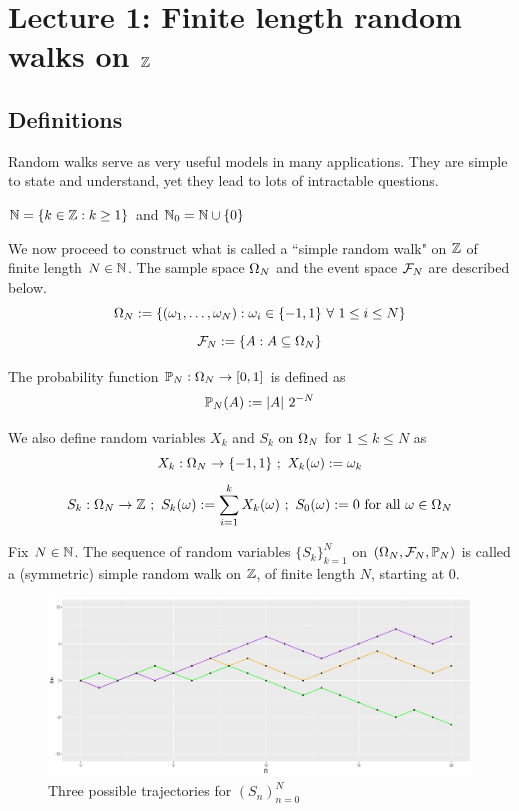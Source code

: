 \documentclass[main]{subfiles}
\begin{document}
\chapter*{Lecture 1: Finite length random walks on $\Z$} %
\setcounter{chapter}{1} %
\setcounter{section}{0}


\vspace{-0.75cm}
\section{Definitions}

Random walks serve as very useful models in many applications. They are simple to state and understand, yet they lead to lots of intractable questions.\\

\begin{notation}
    $ \N=\{k\in\Z:k\ge 1\} $ and $ \N_{0}=\N \cup \{0\} $\\
\end{notation}
We now proceed to construct what is called a ``simple random walk" on $ \Z $ of finite length $ N\in\N $.
The sample space $ \O_N $ and the event space $ \F_N $ are described below.
$$ \O_N:=\{(\o_1,\ldots,\o_N):\o_i\in\{-1,1\}\ \forall\ 1\le i\le N\} $$
$$ \F_N:=\{A:A\subseteq \O_N\} $$

The probability function $ \P_N:\O_N\to [0,1] $ is defined as
$$ \P_N(A):=\lvert A\rvert\ 2^{-N} $$

We also define random variables $ X_k $ and $ S_k $ on $ \O_N $ for $ 1\le k\le N $ as
$$ X_k:\O_N\to\{-1,1\}\lb X_k(\o):=\o_k$$
$$ S_k:\O_N\to\Z\lb S_k(\o):=\sum_{i=1}^kX_k(\o)\lb S_0(\o):=0 \text{ for all } \o\in\O_N$$
\begin{definition}
    Fix $ N\in\N $. The sequence of random variables $ \{S_k\}_{k=1}^N $ on $ (\O_N,\F_N, \P_N) $ is called a (symmetric) simple random walk on $\Z$, of finite length $ N $, starting at $ 0 $.
\end{definition}

\begin{figure}[H]
    \centering
    \caption{Three possible trajectories for $(S_{n})_{n=0}^{N}$}
    \includegraphics{threerw.png}
\end{figure}
\end{document}
